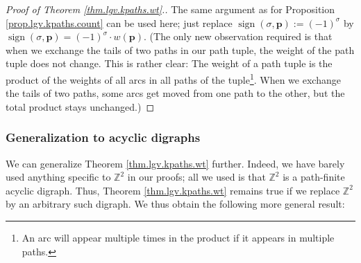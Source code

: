 \begin{proof}
[Proof of Theorem \ref{thm.lgv.kpaths.wt}.]The same argument as for
Proposition \ref{prop.lgv.kpaths.count} can be used here; just replace
$\operatorname*{sign}\left(  \sigma,\mathbf{p}\right)  :=\left(  -1\right)
^{\sigma}$ by $\operatorname*{sign}\left(  \sigma,\mathbf{p}\right)  =\left(
-1\right)  ^{\sigma}\cdot w\left(  \mathbf{p}\right)  $. (The only new
observation required is that when we exchange the tails of two paths in our
path tuple, the weight of the path tuple does not change. This is rather
clear: The weight of a path tuple is the product of the weights of all arcs in
all paths of the tuple\footnote{An arc will appear multiple times in the
product if it appears in multiple paths.}. When we exchange the tails of two
paths, some arcs get moved from one path to the other, but the total product
stays unchanged.)
\end{proof}

\subsubsection{Generalization to acyclic digraphs}

We can generalize Theorem \ref{thm.lgv.kpaths.wt} further. Indeed, we have
barely used anything specific to $\mathbb{Z}^{2}$ in our proofs; all we used
is that $\mathbb{Z}^{2}$ is a path-finite acyclic digraph. Thus, Theorem
\ref{thm.lgv.kpaths.wt} remains true if we replace $\mathbb{Z}^{2}$ by an
arbitrary such digraph. We thus obtain the following more general result:


